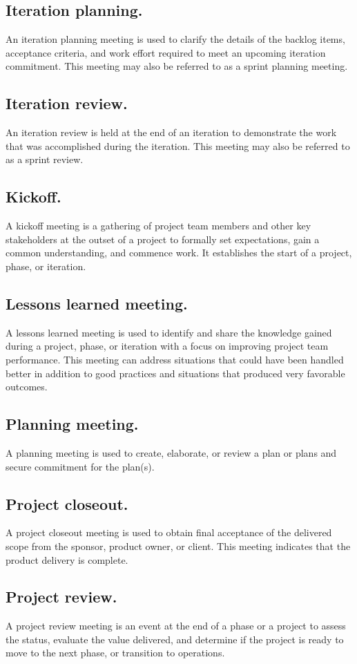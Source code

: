 \documentclass[11pt]{article}
\begin{document}
\subsection{Iteration planning.}
\label{sec:org859d32a}
An iteration planning meeting is used to clarify the details of the backlog items, acceptance criteria, and work effort required to meet an upcoming iteration commitment. This meeting may also be referred to as a sprint planning meeting.
\subsection{Iteration review.}
\label{sec:orgb1ec3a8}
An iteration review is held at the end of an iteration to demonstrate the work that was accomplished during the iteration. This meeting may also be referred to as a sprint review.
\subsection{Kickoff.}
\label{sec:org989e06c}
A kickoff meeting is a gathering of project team members and other key stakeholders at the outset of a project to formally set expectations, gain a common understanding, and commence work. It establishes the start of a project, phase,
or iteration.
\subsection{Lessons learned meeting.}
\label{sec:org549386f}
A lessons learned meeting is used to identify and share the knowledge gained during a project, phase, or iteration with a focus on improving project team performance. This meeting can address situations that could have been handled better in addition to good practices and situations that produced very favorable outcomes.
\subsection{Planning meeting.}
\label{sec:org6efe5bb}
A planning meeting is used to create, elaborate, or review a plan or plans and secure commitment for the plan(s).
\subsection{Project closeout.}
\label{sec:org5be48cc}
A project closeout meeting is used to obtain final acceptance of the delivered scope from the sponsor, product owner, or client. This meeting indicates that the product delivery is complete.
\subsection{Project review.}
\label{sec:orgb58dca2}
A project review meeting is an event at the end of a phase or a project to assess the status, evaluate the value delivered, and determine if the project is ready to move to the next phase, or transition to operations.
\end{document}
